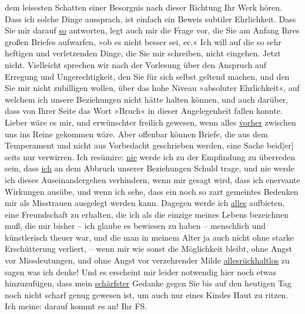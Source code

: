 \begin{ledgroupsized}[t]{13cm}
               dem leisesten Schatten einer Besorgnis nach dieser Richtung Ihr Werk hören. Dass ich
               solche Dinge aussprach, ist einfach ein Beweis subtiler Ehrlichkeit. Dass Sie mir
               darauf \uline{so} antworten, legt auch mir die Frage vor, die
               Sie am Anfang Ihres großen Briefes aufwarfen, »ob es nicht besser sei, ec.« \pend
           \pstart
           Ich will auf die so sehr heftigen und verletzenden Dinge, die Sie mir schreiben,
               nicht eingehen. Jetzt nicht. Vielleicht sprechen wir nach der Vorlesung über den
               Anspruch auf Erregung und Ungerechtigkeit, den Sie für sich selbst geltend machen,
               und den Sie mir nicht zubilligen wollen, über das hohe Niveau »absoluter
               Ehrlichkeit«, auf welchem ich unsere Beziehungen nicht hätte halten können, und auch
               darüber, dass von Ihrer Seite das Wort »Bruch« in dieser Angelegenheit fallen konnte.
               Lieber wäre es mir, und erwünschter freilich gewesen, wenn alles \uline{vorher} zwischen uns ins Reine gekommen wäre. Aber offenbar können
               Briefe, die aus dem Temperament und nicht aus Vorbedacht geschrieben werden, eine
               Sache beid{[}er{]} seits nur verwirren. Ich resümire: \uline{nie} werde ich {\pb}zu der Empfindung zu überreden
               sein, dass \uline{ich} an dem Abbruch unserer Beziehungen
               Schuld trage, und nie werde ich dieses Auseinandergehen verhindern, wenn mir gesagt
               wird, dass ich enervante Wirkungen ausübe, und wenn ich sehe, dass ein noch so zart
               gemeintes Bedenken mir als Misstrauen ausgelegt werden kann. \pend
           \pstart
           Dagegen werde ich \uline{alles} aufbieten, eine Freundschaft
               zu erhalten, die ich als die einzige meines Lebens bezeichnen muß, die mir bisher –
               ich glaube es bewiesen zu haben – menschlich und künstlerisch theuer war, und die man
               in meinem Alter ja auch nicht ohne starke Erschütterung verliert, – wenn mir wie
               sonst die Möglichkeit bleibt, ohne Angst vor Missdeutungen, und ohne Angst vor
               verzehrender Milde \uline{alles}\uline{rückhaltlos} zu sagen was ich denke! Und es erscheint
               mir leider notwendig hier noch etwas hinzuzufügen, dass mein \uline{schärfster} Gedanke \introOben{}gegen Sie\introOben{} bis auf den
               heutigen Tag noch nicht scharf genug gewesen ist, um auch nur eines Kindes Haut zu
               ritzen. Ich meine: darauf kommt es an! \pend
           \pstart Ihr \spacefill\mbox{FS.}\pend{}
         
         \endnumbering{}\end{ledgroupsized}\begin{anhang}\end{anhang}\newcommand{\dateiname}{L03355}\newcommand{\titel}{Felix Salten an Arthur Schnitzler, [11. 11?. 1903]}\newcommand{\editorInnen}{Martin Anton Müller und Laura Untner}
      